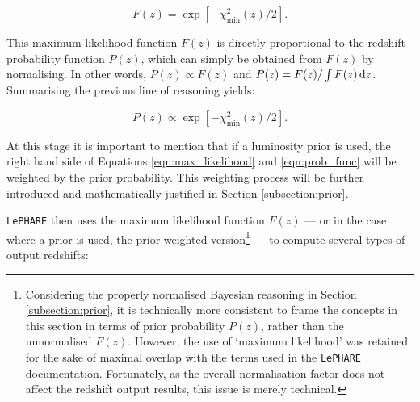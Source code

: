 \begin{equation}
F(z) = \exp[-\chi_{\mathrm{min}}^2(z)/2].\label{eqn:max_likelihood}
\end{equation}

\noindent This maximum likelihood function $F(z)$ is directly proportional to the redshift probability function $P(z)$, which can simply be obtained from $F(z)$ by normalising. In other words, $P(z)\propto F(z)$ and $P(z) = F(z)/ \int F(z) \mathop{}\!\mathrm{d} z$. Summarising the previous line of reasoning yields:

\begin{equation}
P(z) \propto \exp[-\chi_{\mathrm{min}}^2(z)/2].\label{eqn:prob_func}
\end{equation}

\noindent At this stage it is important to mention that if a luminosity prior is used, the right hand side of Equations \ref{eqn:max_likelihood} and \ref{eqn:prob_func} will be weighted by the prior probability. This weighting process will be further introduced and mathematically justified in Section \ref{subsection:prior}.\par


\texttt{LePHARE} then uses the maximum likelihood function $F(z)$ --- or in the case where a prior is used, the prior-weighted version\footnote{Considering the properly normalised Bayesian reasoning in Section \ref{subsection:prior}, it is technically more consistent to frame the concepts in this section in terms of prior probability $P(z)$, rather than the unnormalised $F(z)$. However, the use of ‘maximum likelihood’ was retained for the sake of maximal overlap with the terms used in the \texttt{LePHARE} documentation. Fortunately, as the overall normalisation factor does not affect the redshift output results, this issue is merely technical.} --- to compute several types of output redshifts: 


